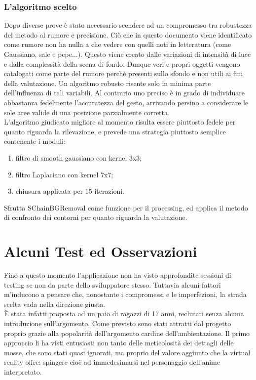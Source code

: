 \documentclass[a4paper,10pt, twocolumn]{article}
\begin{document}
  
  \subsubsection{L'algoritmo scelto}
  Dopo diverse prove \`{e} stato necessario scendere ad un compromesso tra robustezza
  del metodo al rumore e precisione. Ci\`{o} che in questo documento viene identificato
  come rumore non ha nulla a che vedere con quelli noti in letteratura (come Gaussiano,
  sale e pepe...). Questo viene creato dalle variazioni di intensit\`{a} di luce e dalla 
  complessit\`{a} della scena di fondo. Dunque veri e 
  propri oggetti vengono catalogati come parte del rumore perch\`{e}
  presenti sullo sfondo e non utili ai fini della valutazione.
  Un algoritmo robusto risente solo in minima parte dell'influenza 
  di tali variabili. 
  Al contrario uno preciso \`{e} in grado di individuare
  abbastanza fedelmente l'accuratezza del gesto, arrivando persino a considerare le sole
  aree valide di una posizione parzialmente corretta.\\
  L'algoritmo giudicato migliore al momento risulta essere piuttosto fedele per quanto
  riguarda la rilevazione,
  e prevede una strategia
  piuttosto semplice contenente i moduli:
  \begin{enumerate}
   \item filtro di smooth gaussiano con kernel 3x3;
   \item filtro Laplaciano con kernel 7x7;
   \item chiusura applicata per 15 iterazioni.
  \end{enumerate}
  Sfrutta SChainBGRemoval come funzione per il processing, ed applica il metodo
  di confronto dei contorni per quanto riguarda la valutazione.
  
 
\section{Alcuni Test ed Osservazioni}
Fino a questo momento l'applicazione non ha visto approfondite sessioni
di testing se non da parte dello sviluppatore stesso.
Tuttavia alcuni fattori m'inducono a pensare che, nonostante i 
compromessi e le imperfezioni, la strada scelta vada nella direzione giusta.\\
\`{E} stata infatti
proposta ad un paio di ragazzi di 17 anni, reclutati senza alcuna 
introduzione sull'argomento. 
Come previsto sono stati 
attratti dal progetto proprio grazie alla
popolarit\`a dell'argomento cardine dell'ambientazione. 
Il primo approccio li ha visti entusiasti non tanto delle meticolosit\`{a}
dei dettagli delle mosse, che sono stati quasi ignorati, 
ma proprio del valore aggiunto che la 
virtual reality offre: spingere cio\`{e} ad immedesimarsi nel personaggio
dell'anime interpretato.
  
\end{document}
